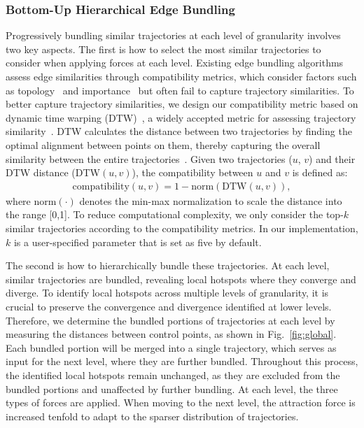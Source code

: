 \subsubsection{Bottom-Up Hierarchical Edge Bundling}
Progressively bundling similar trajectories at each level of granularity involves two key aspects.
The first is how to select the most similar trajectories to consider when applying forces at each level.
Existing edge bundling algorithms assess edge similarities through compatibility metrics, which consider factors such as topology~\cite{selassie2011divided} and importance~\cite{Quan2012tgieb} but often fail to capture trajectory similarities.
To better capture trajectory similarities, we design our compatibility metric based on dynamic time warping (DTW)~\cite{muller2007dtw}, a widely accepted metric for assessing trajectory similarity~\cite{zheng2015trajectory}.
DTW calculates the distance between two trajectories by finding the optimal alignment between points on them, thereby capturing the overall similarity between the entire trajectories~\cite{muller2007dtw}.
Given two trajectories ($u$, $v$) and their DTW distance (DTW$(u,v)$), the compatibility between $u$ and $v$ is defined as:
\begin{equation}
    \begin{aligned}
    \text{compatibility}(u,v)=1 - \text{norm}(\text{DTW}(u,v)),
    \end{aligned}
\end{equation}
where norm$(\cdot)$ denotes the min-max normalization to scale the distance into the range [0,1].
To reduce computational complexity, we only consider the top-$k$ similar trajectories according to the compatibility metrics.
In our implementation, $k$ is a user-specified parameter that is set as five by default.

The second is how to hierarchically bundle these trajectories.
At each level, similar trajectories are bundled, revealing local hotspots where they converge and diverge.
To identify local hotspots across multiple levels of granularity, it is crucial to preserve the convergence and divergence identified at lower levels.
Therefore, we determine the bundled portions of trajectories at each level by measuring the distances between control points, as shown in Fig.~\ref{fig:global}.
Each bundled portion will be merged into a single trajectory, which serves as input for the next level, where they are further bundled.
Throughout this process, the identified local hotspots remain unchanged, as they are excluded from the bundled portions and unaffected by further bundling.
At each level, the three types of forces are applied.
When moving to the next level, the attraction force is increased tenfold to adapt to the sparser distribution of trajectories.



